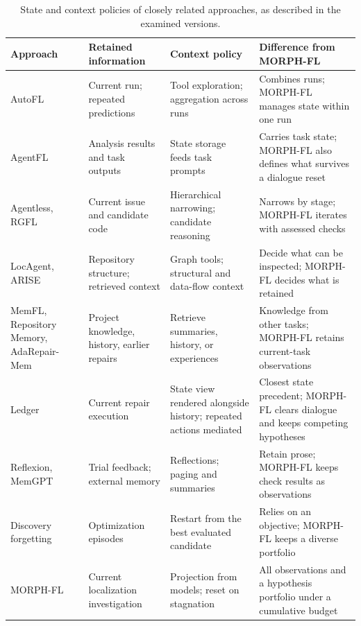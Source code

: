 \documentclass[letterpaper,journal]{IEEEtran}
\newcommand{\tool}{MORPH-FL}
\begin{document}
\begin{table}[t]
\caption{State and context policies of closely related approaches, as described in the examined versions.}\label{tab:closest}
\centering\small\setlength{\tabcolsep}{3pt}
\renewcommand{\arraystretch}{1.12}
\begin{tabular}{@{}>{\raggedright\arraybackslash}p{}>{\raggedright\arraybackslash}p{}>{\raggedright\arraybackslash}p{}>{\raggedright\arraybackslash}p{}@{}}\toprule
Approach & Retained information & Context policy & Difference from \tool{}\\\midrule
AutoFL~\cite{autofl2024} & Current run; repeated predictions & Tool exploration; aggregation across runs & Combines runs; \tool{} manages state within one run\\
AgentFL~\cite{agentfl2024} & Analysis results and task outputs & State storage feeds task prompts & Carries task state; \tool{} also defines what survives a dialogue reset\\
Agentless, RGFL~\cite{agentless2025,rgfl2026} & Current issue and candidate code & Hierarchical narrowing; candidate reasoning & Narrows by stage; \tool{} iterates with assessed checks\\
LocAgent, ARISE~\cite{locagent2025,arise2026} & Repository structure; retrieved context & Graph tools; structural and data-flow context & Decide what can be inspected; \tool{} decides what is retained\\
MemFL, Repository Memory, AdaRepair-Mem~\cite{memfl2025,repomem2026,adarepair2026} & Project knowledge, history, earlier repairs & Retrieve summaries, history, or experiences & Knowledge from other tasks; \tool{} retains current-task observations\\
Ledger~\cite{ledger2026} & Current repair execution & State view rendered alongside history; repeated actions mediated & Closest state precedent; \tool{} clears dialogue and keeps competing hypotheses\\
Reflexion, MemGPT~\cite{reflexion2023,memgpt2024} & Trial feedback; external memory & Reflections; paging and summaries & Retain prose; \tool{} keeps check results as observations\\
Discovery forgetting~\cite{forgetting2026} & Optimization episodes & Restart from the best evaluated candidate & Relies on an objective; \tool{} keeps a diverse portfolio\\
\tool{} & Current localization investigation & Projection from models; reset on stagnation & All observations and a hypothesis portfolio under a cumulative budget\\
\bottomrule\end{tabular}
\end{table}
\end{document}

